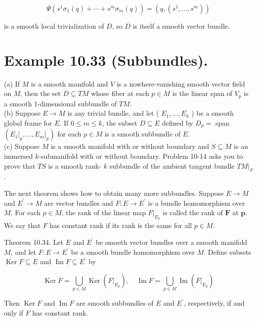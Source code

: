 \documentclass[10pt]{article}
\begin{document}
$$
\Psi\left(s^{1} \sigma_{1}(q)+\cdots+s^{m} \sigma_{m}(q)\right)=\left(q,\left(s^{1}, \ldots, s^{m}\right)\right)
$$

is a smooth local trivialization of $D$, so $D$ is itself a smooth vector bundle.

\section*{Example 10.33 (Subbundles).}
(a) If $M$ is a smooth manifold and $V$ is a nowhere-vanishing smooth vector field on $M$, then the set $D \subseteq T M$ whose fiber at each $p \in M$ is the linear span of $V_{p}$ is a smooth 1-dimensional subbundle of $T M$.\\
(b) Suppose $E \rightarrow M$ is any trivial bundle, and let ( $E_{1}, \ldots, E_{k}$ ) be a smooth global frame for $E$. If $0 \leq m \leq k$, the subset $D \subseteq E$ defined by $D_{p}=$ span $\left(\left.E_{1}\right|_{p}, \ldots,\left.E_{m}\right|_{p}\right)$ for each $p \in M$ is a smooth subbundle of $E$.\\
(c) Suppose $M$ is a smooth manifold with or without boundary and $S \subseteq M$ is an immersed $k$-submanifold with or without boundary. Problem 10-14 asks you to prove that $T S$ is a smooth rank- $k$ subbundle of the ambient tangent bundle $\left.T M\right|_{S}$.

The next theorem shows how to obtain many more subbundles. Suppose $E \rightarrow M$ and $E^{\prime} \rightarrow M$ are vector bundles and $F: E \rightarrow E^{\prime}$ is a bundle homomorphism over $M$. For each $p \in M$, the rank of the linear map $\left.F\right|_{E_{p}}$ is called the rank of $\boldsymbol{F}$ at $\boldsymbol{p}$. We say that $F$ has constant rank if its rank is the same for all $p \in M$.

Theorem 10.34. Let $E$ and $E^{\prime}$ be smooth vector bundles over a smooth manifold $M$, and let $F: E \rightarrow E^{\prime}$ be a smooth bundle homomorphism over $M$. Define subsets $\operatorname{Ker} F \subseteq E$ and $\operatorname{Im} F \subseteq E^{\prime}$ by

$$
\operatorname{Ker} F=\bigcup_{p \in M} \operatorname{Ker}\left(\left.F\right|_{E_{p}}\right), \quad \operatorname{Im} F=\bigcup_{p \in M} \operatorname{Im}\left(\left.F\right|_{E_{p}}\right)
$$

Then $\operatorname{Ker} F$ and $\operatorname{Im} F$ are smooth subbundles of $E$ and $E^{\prime}$, respectively, if and only if $F$ has constant rank.
\end{document}
